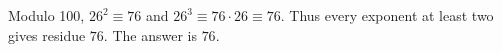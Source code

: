 Modulo 100, $26^2\equiv76$ and $26^3\equiv76\cdot26\equiv76$. Thus every exponent at least two gives residue $76$. The answer is $\boxed{76}$.
